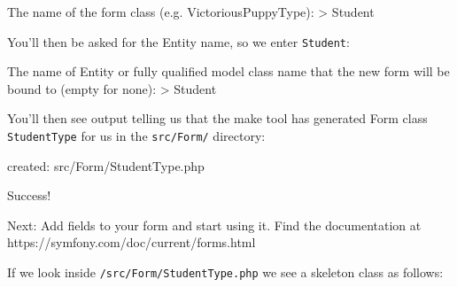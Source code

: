 \documentclass[a4paperpaper,openright]{book}
\newenvironment{Shaded}{}{}
\newcommand{\BuiltInTok}[1]{#1}
\newcommand{\ExtensionTok}[1]{#1}
\newcommand{\NormalTok}[1]{#1}
\newcommand{\OperatorTok}[1]{\textcolor[rgb]{0.40,0.40,0.40}{#1}}
\begin{document}
\begin{Shaded}
\begin{Highlighting}[]
    \ExtensionTok{The}\NormalTok{ name of the form class (e.g. VictoriousPuppyType)}\BuiltInTok{:}
    \OperatorTok{>} \ExtensionTok{Student}
\end{Highlighting}
\end{Shaded}

You'll then be asked for the Entity name, so we enter \texttt{Student}:

\begin{Shaded}
\begin{Highlighting}[]
    \ExtensionTok{The}\NormalTok{ name of Entity or fully qualified model class name that the new form will be bound to (empty for none)}\BuiltInTok{:}
    \OperatorTok{>} \ExtensionTok{Student}
\end{Highlighting}
\end{Shaded}

You'll then see output telling us that the make tool has generated Form
class \texttt{StudentType} for us in the \texttt{src/Form/} directory:

\begin{Shaded}
\begin{Highlighting}[]
    \ExtensionTok{created}\NormalTok{: src/Form/StudentType.php}

    \ExtensionTok{Success}\NormalTok{! }

    \ExtensionTok{Next}\NormalTok{: Add fields to your form and start using it.}
    \ExtensionTok{Find}\NormalTok{ the documentation at https://symfony.com/doc/current/forms.html}
\end{Highlighting}
\end{Shaded}

If we look inside \texttt{/src/Form/StudentType.php} we see a skeleton
class as follows:
\end{document}

